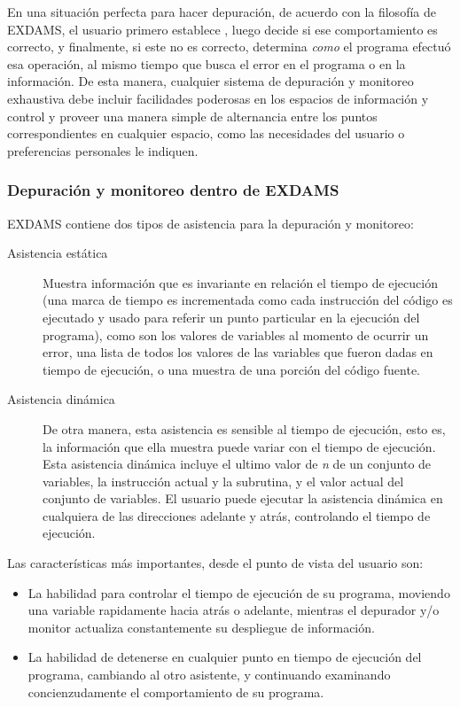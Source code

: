 \documentclass[12pt,a4paper]{report}
\begin{document}
En una situación perfecta para hacer depuración, de acuerdo con la filosofía de EXDAMS, el usuario primero establece , luego decide si ese comportamiento es correcto, y finalmente, si este no es correcto, determina \textit{como} el programa efectuó esa operación, al mismo tiempo que busca el error en el programa o en la información.  De esta manera, cualquier sistema de depuración y monitoreo exhaustiva debe incluir facilidades poderosas en los espacios de información y control y proveer una manera simple de alternancia entre los puntos correspondientes en cualquier espacio, como las necesidades del usuario o preferencias personales le indiquen.

			\subsubsection[Depuración y monitoreo]{Depuración y monitoreo dentro de EXDAMS}

EXDAMS contiene dos tipos de asistencia para la depuración y monitoreo:

\begin{description}
	\item[Asistencia estática] Muestra información que es invariante en relación el tiempo de ejecución (una marca de tiempo es incrementada como cada instrucción del código es ejecutado y usado para referir un punto particular en la ejecución del programa), como son los valores de variables al momento de ocurrir un error, una lista de todos los valores de las variables que fueron dadas en tiempo de ejecución, o una muestra de una porción del código fuente.

	\item[Asistencia dinámica] De otra manera, esta asistencia es sensible al tiempo de ejecución, esto es, la información que ella muestra puede variar con el tiempo de ejecución.  Esta asistencia dinámica incluye el ultimo valor de \textit{n} de un conjunto de variables, la instrucción actual y la subrutina, y el valor actual del conjunto de variables.  El usuario puede ejecutar la asistencia dinámica en cualquiera de las direcciones adelante y atrás, controlando el tiempo de ejecución.

\end{description}

Las características más importantes, desde el punto de vista del usuario son:

\begin{itemize}
	\item La habilidad para controlar el tiempo de ejecución de su programa, moviendo una variable rapidamente hacia atrás o adelante, mientras el depurador y/o monitor actualiza constantemente su despliegue de información.

	\item La habilidad de detenerse en cualquier punto en tiempo de ejecución del programa, cambiando al otro asistente, y continuando examinando concienzudamente el comportamiento de su programa.

\end{itemize}
\end{document}
